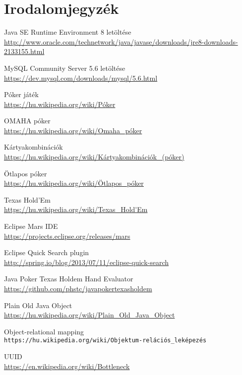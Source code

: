 \part{Irodalomjegyzék}

\begin{thebibliography}{9}

Java SE Runtime Environment 8 letöltése \\
\url{http://www.oracle.com/technetwork/java/javase/downloads/jre8-downloads-2133155.html}

MySQL Community Server 5.6 letöltése \\
\url{https://dev.mysql.com/downloads/mysql/5.6.html}

Póker játék \\
\url{https://hu.wikipedia.org/wiki/Póker}

OMAHA póker \\
\url{https://hu.wikipedia.org/wiki/Omaha_póker}

Kártyakombinációk \\
\url{https://hu.wikipedia.org/wiki/Kártyakombinációk_(póker)}

Ötlapos póker \\
\url{https://hu.wikipedia.org/wiki/Ötlapos_póker}

Texas Hold'Em \\
\url{https://hu.wikipedia.org/wiki/Texas_Hold'Em}

Eclipse Mars IDE \\
\url{https://projects.eclipse.org/releases/mars}

Eclipse Quick Search plugin \\
\url{http://spring.io/blog/2013/07/11/eclipse-quick-search}

Java Poker Texas Holdem Hand Evaluator \\
\url{https://github.com/phstc/javapokertexasholdem}

Plain Old Java Object \\
\url{https://hu.wikipedia.org/wiki/Plain_Old_Java_Object}

Object-relational mapping \\
\texttt{https://hu.wikipedia.org/wiki/Objektum-relációs\_leképezés}

UUID \\
\url{https://en.wikipedia.org/wiki/Bottleneck}


\end{thebibliography}
